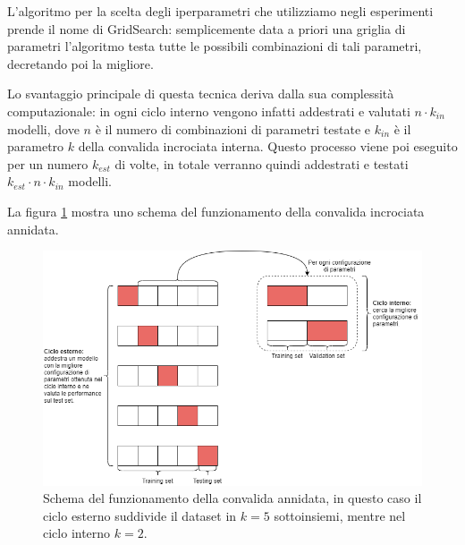 \documentclass[../../main.tex]{subfiles}
\begin{document}
    L'algoritmo per la scelta degli iperparametri che utilizziamo negli esperimenti prende il nome di GridSearch: semplicemente data a priori una griglia di parametri l'algoritmo testa tutte le possibili combinazioni di tali parametri, decretando poi la migliore.

    Lo svantaggio principale di questa tecnica deriva dalla sua complessità computazionale: in ogni ciclo interno vengono infatti addestrati e valutati $n \cdot k_{in}$ modelli, dove $n$ è il numero di combinazioni di parametri testate e $k_{in}$ è il parametro $k$ della convalida incrociata interna. Questo processo viene poi eseguito per un numero $k_{est}$ di volte, in totale verranno quindi addestrati e testati $k_{est} \cdot n \cdot k_{in}$ modelli.

    La figura \ref{fig:nestedCV} mostra uno schema del funzionamento della convalida incrociata annidata.

    \begin{figure}[H]
        \centering
        \includegraphics[width=\textwidth]{immagini/6_3/nestedCV.drawio.png}
        \caption{}
        \label{fig:nestedCV}
        \caption{Schema del funzionamento della convalida annidata, in questo caso il ciclo esterno suddivide il dataset in $k=5$ sottoinsiemi, mentre nel ciclo interno $k = 2$.}
    \end{figure}
\end{document}
